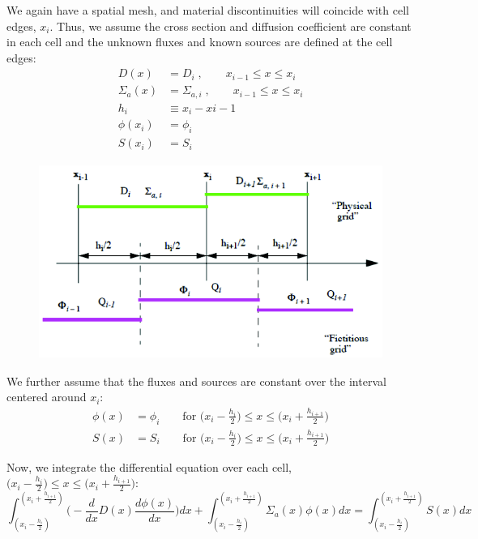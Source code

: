 \documentclass[12pt]{article}
\begin{document}
We again have a spatial mesh, and material discontinuities will coincide with cell edges, $x_i$. Thus, we assume the cross section and diffusion coefficient are constant in each cell and the unknown fluxes and known sources are defined at the cell edges:
\begin{align}
D(x) &= D_i\;, \qquad x_{i-1} \leq x \leq x_i \nonumber \\
\Sigma_a(x) &= \Sigma_{a,i}\;, \qquad x_{i-1} \leq x \leq x_i \nonumber \\
h_i &\equiv x_{i} - x{i-1} \nonumber \\
\phi(x_i) &= \phi_i \nonumber \\
S(x_i) &= S_i \nonumber 
\end{align}
%
\begin{figure}[h!]
\includegraphics[height=2.5in]{FVM-DE}
\end{figure}

We further assume that the fluxes and sources are constant over the interval centered around $x_i$:
%
\begin{align}
\phi(x) &= \phi_i \qquad \text{for } \bigl(x_i - \frac{h_i}{2}\bigr) \leq x \leq \bigl(x_i + \frac{h_{i+1}}{2}\bigr) \nonumber \\
S(x) &= S_i \qquad \text{for } \bigl(x_i - \frac{h_i}{2}\bigr) \leq x \leq \bigl(x_i + \frac{h_{i+1}}{2}\bigr) \nonumber 
\end{align}

Now, we integrate the differential equation over each cell, $\bigl(x_i - \frac{h_i}{2}\bigr) \leq x \leq \bigl(x_i + \frac{h_{i+1}}{2}\bigr)$:
%
\[\int_{(x_i - \frac{h_i}{2})}^{(x_i + \frac{h_{i+1}}{2})} \biggl(  -\frac{d}{dx}D(x)\frac{d \phi(x)}{dx}\biggr) dx + \int_{(x_i - \frac{h_i}{2})}^{(x_i + \frac{h_{i+1}}{2})} \Sigma_a(x) \phi(x) dx = \int_{(x_i - \frac{h_i}{2})}^{(x_i + \frac{h_{i+1}}{2})} S(x) dx\]
\end{document}
